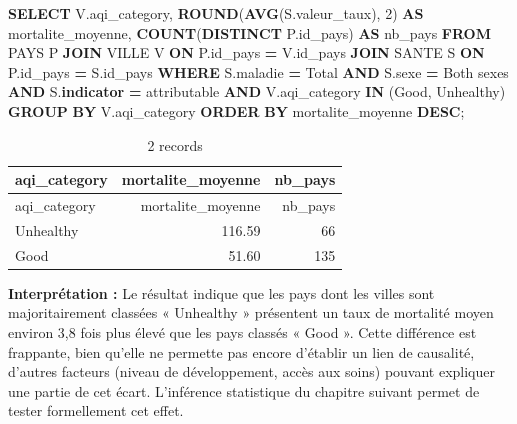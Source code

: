 \documentclass[mstat,12pt]{unswthesis}
\newenvironment{Shaded}{\begin{snugshade}}{\end{snugshade}}
\newcommand{\DecValTok}[1]{\textcolor[rgb]{0.00,0.00,0.81}{#1}}
\newcommand{\FunctionTok}[1]{\textcolor[rgb]{0.13,0.29,0.53}{\textbf{#1}}}
\newcommand{\KeywordTok}[1]{\textcolor[rgb]{0.13,0.29,0.53}{\textbf{#1}}}
\newcommand{\NormalTok}[1]{#1}
\newcommand{\OperatorTok}[1]{\textcolor[rgb]{0.81,0.36,0.00}{\textbf{#1}}}
\newcommand{\StringTok}[1]{\textcolor[rgb]{0.31,0.60,0.02}{#1}}
\begin{document}
\begin{Shaded}
\begin{Highlighting}[]
\KeywordTok{SELECT}\NormalTok{   V.aqi\_category,}
        \FunctionTok{ROUND}\NormalTok{(}\FunctionTok{AVG}\NormalTok{(S.valeur\_taux), }\DecValTok{2}\NormalTok{) }\KeywordTok{AS}\NormalTok{ mortalite\_moyenne,}
        \FunctionTok{COUNT}\NormalTok{(}\KeywordTok{DISTINCT}\NormalTok{ P.id\_pays)    }\KeywordTok{AS}\NormalTok{ nb\_pays}
\KeywordTok{FROM}\NormalTok{     PAYS  P}
\KeywordTok{JOIN}\NormalTok{     VILLE V }\KeywordTok{ON}\NormalTok{ P.id\_pays }\OperatorTok{=}\NormalTok{ V.id\_pays}
\KeywordTok{JOIN}\NormalTok{     SANTE S }\KeywordTok{ON}\NormalTok{ P.id\_pays }\OperatorTok{=}\NormalTok{ S.id\_pays}
\KeywordTok{WHERE}\NormalTok{    S.maladie    }\OperatorTok{=} \StringTok{\textquotesingle{}Total\textquotesingle{}}
  \KeywordTok{AND}\NormalTok{    S.sexe       }\OperatorTok{=} \StringTok{\textquotesingle{}Both sexes\textquotesingle{}}
  \KeywordTok{AND}\NormalTok{    S.}\KeywordTok{indicator} \OperatorTok{=} \StringTok{\textquotesingle{}attributable\textquotesingle{}}
  \KeywordTok{AND}\NormalTok{    V.aqi\_category }\KeywordTok{IN}\NormalTok{ (}\StringTok{\textquotesingle{}Good\textquotesingle{}}\NormalTok{, }\StringTok{\textquotesingle{}Unhealthy\textquotesingle{}}\NormalTok{)}
\KeywordTok{GROUP} \KeywordTok{BY}\NormalTok{ V.aqi\_category}
\KeywordTok{ORDER} \KeywordTok{BY}\NormalTok{ mortalite\_moyenne }\KeywordTok{DESC}\NormalTok{;}
\end{Highlighting}
\end{Shaded}

\begin{longtable}[]{@{}lrr@{}}
\caption{2 records}\tabularnewline
\toprule\noalign{}
aqi\_category & mortalite\_moyenne & nb\_pays \\
\midrule\noalign{}
\endfirsthead
\toprule\noalign{}
aqi\_category & mortalite\_moyenne & nb\_pays \\
\midrule\noalign{}
\endhead
\bottomrule\noalign{}
\endlastfoot
Unhealthy & 116.59 & 66 \\
Good & 51.60 & 135 \\
\end{longtable}

\textbf{Interprétation :} Le résultat indique que les pays dont les
villes sont majoritairement classées « Unhealthy » présentent un taux de
mortalité moyen environ 3,8 fois plus élevé que les pays classés « Good
». Cette différence est frappante, bien qu'elle ne permette pas encore
d'établir un lien de causalité, d'autres facteurs (niveau de
développement, accès aux soins) pouvant expliquer une partie de cet
écart. L'inférence statistique du chapitre suivant permet de tester
formellement cet effet.
\end{document}
